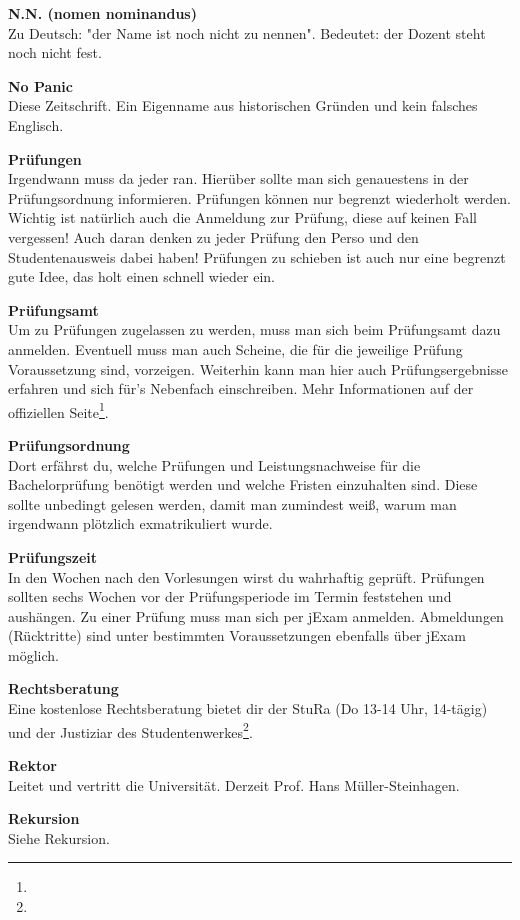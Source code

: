 \textbf{N.N. (nomen nominandus)} \\
Zu Deutsch:
"der Name ist noch nicht zu nennen".
Bedeutet:
der Dozent steht noch nicht fest.

\textbf{No Panic} \\
Diese Zeitschrift.
Ein Eigenname aus historischen Gründen und kein falsches Englisch.

\textbf{Prüfungen} \\
Irgendwann muss da jeder ran.
Hierüber sollte man sich genauestens in der Prüfungsordnung informieren.
Prüfungen können nur begrenzt wiederholt werden.
Wichtig ist natürlich auch die Anmeldung zur Prüfung, diese auf keinen Fall vergessen!
Auch daran denken zu jeder Prüfung den Perso und den Studentenausweis dabei haben!
Prüfungen zu schieben ist auch nur eine begrenzt gute Idee, das holt einen schnell wieder ein.

\textbf{Prüfungsamt} \\
Um zu Prüfungen zugelassen zu werden, muss man sich beim Prüfungsamt dazu anmelden.
Eventuell muss man auch Scheine, die für die jeweilige Prüfung Voraussetzung sind, vorzeigen.
Weiterhin kann man hier auch Prüfungsergebnisse erfahren und sich für's Nebenfach einschreiben.
Mehr Informationen auf der offiziellen Seite\footnote{}.

\textbf{Prüfungsordnung} \\
Dort erfährst du, welche Prüfungen und Leistungsnachweise für die Bachelorprüfung benötigt werden und welche Fristen einzuhalten sind.
Diese sollte unbedingt gelesen werden, damit man zumindest weiß, warum man irgendwann plötzlich exmatrikuliert wurde.

\textbf{Prüfungszeit} \\
In den Wochen nach den Vorlesungen wirst du wahrhaftig geprüft.
Prüfungen sollten sechs Wochen vor der Prüfungsperiode im Termin feststehen und aushängen.
Zu einer Prüfung muss man sich per jExam anmelden.
Abmeldungen (Rücktritte) sind unter bestimmten Voraussetzungen ebenfalls über jExam möglich.

\textbf{Rechtsberatung} \\
Eine kostenlose Rechtsberatung bietet dir der StuRa (Do 13-14 Uhr, 14-tägig) und der Justiziar des Studentenwerkes\footnote{}.

\textbf{Rektor} \\
Leitet und vertritt die Universität.
Derzeit Prof. Hans Müller-Steinhagen.

\textbf{Rekursion} \\
Siehe Rekursion.

